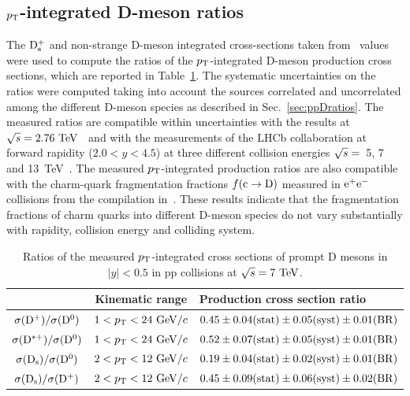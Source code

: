 \subsection{$p_{\rm T}$-integrated D-meson ratios}
\label{sec:ppDratiosPtint}
The ${\rm D_s^+}$ and non-strange D-meson integrated cross-sections taken from~\cite{Acharya:2017jgo} values 
were used to compute the ratios of the $p_{\rm T}$-integrated D-meson 
production cross sections, which are reported in Table~\ref{tab:ptintegrat}.
The systematic uncertainties on the ratios were computed taking into
account the sources correlated and uncorrelated among the different D-meson
species as described in Sec.~\ref{sec:ppDratios}.
The measured ratios are compatible within uncertainties with the results at
$\sqrt{s}=2.76~\mathrm{TeV}$~\cite{Abelev:2012vra} and with the measurements of
the LHCb collaboration at forward rapidity ($2.0<y<4.5$) at three 
different collision energies $\sqrt{s}=$~5, 7 and 
13~TeV~\cite{Aaij:2013mga,Aaij:2016jht,Aaij:2015bpa}.
The measured $p_{\rm T}$-integrated production ratios are also compatible with the
charm-quark fragmentation fractions $f(\rm c\to D)$ measured in ${\rm e^+e^-}$ 
collisions from the compilation in~\cite{Gladilin:2014tba}.
These results indicate that the fragmentation fractions of charm quarks into
different D-meson species do not vary substantially with rapidity, collision
energy and colliding system.
\begin{table}[!h]
\centering
\begin{tabular}{c|c|l} 
 & Kinematic range & Production cross section ratio \\
\hline
\rule{0pt}{12pt} 
$\sigma({\rm D^+}) / \sigma({\rm D^0})$ & $1<p_{\rm T}<24~\mathrm{GeV}/c$ & $0.45 \pm 0.04 ({\rm stat}) \pm 0.05 ({\rm syst}) \pm 0.01 ({\rm BR})$\\[1ex]
$\sigma({\rm D^{*+}}) / \sigma({\rm D^0})$ & $1<p_{\rm T}<24~\mathrm{GeV}/c$ & $0.52 \pm 0.07 ({\rm stat}) \pm 0.05 ({\rm syst}) \pm 0.01 ({\rm BR})$\\[1ex]
$\sigma({\rm D_s}) / \sigma({\rm D^0})$    & $2<p_{\rm T}<12~\mathrm{GeV}/c$ & $0.19 \pm 0.04 ({\rm stat}) \pm 0.02 ({\rm syst}) \pm 0.01 ({\rm BR})$\\[1ex]
$\sigma({\rm D_s}) / \sigma({\rm D^+})$    & $2<p_{\rm T}<12~\mathrm{GeV}/c$ & $0.45 \pm 0.09 ({\rm stat}) \pm 0.06 ({\rm syst}) \pm 0.02 ({\rm BR})$\\[1ex]
\hline
\end{tabular}
\caption{Ratios of the measured $p_{\rm T}$-integrated cross sections of prompt D mesons in $|y| < 0.5$ in pp collisions at $\sqrt{s} = 7~\mathrm{TeV}$.}
\label{tab:ptintegrat}
\end{table}

